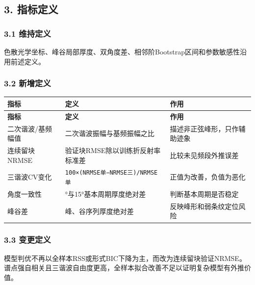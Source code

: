 \documentclass[11pt,a4paper]{ctexart}
\begin{document}
\subsection*{3. 指标定义}
\subsubsection*{3.1 维持定义}
色散光学坐标、峰谷局部厚度、双角度差、相邻阶Bootstrap区间和参数敏感性沿用前述定义。


\subsubsection*{3.2 新增定义}
\begin{center}
\scriptsize
\begin{longtable}{|>{\raggedright\arraybackslash}p{}|>{\raggedright\arraybackslash}p{}|>{\raggedright\arraybackslash}p{}|}
\hline
\textbf{指标} & \textbf{定义} & \textbf{作用} \\ \hline
\endfirsthead
\hline \textbf{指标} & \textbf{定义} & \textbf{作用} \\ \hline
\endhead
二次谐波/基频幅值 & 二次谐波振幅与基频振幅之比 & 描述非正弦峰形，只作辅助迹象 \\ \hline
连续留块NRMSE & 验证块RMSE除以训练折反射率标准差 & 比较未见频段外推误差 \\ \hline
三谐波CV变化 & \texttt{100×(NRMSE单−NRMSE三)/NRMSE单} & 正值为改善，负值为恶化 \\ \hline
角度一致性 & 10°与15°基本周期厚度绝对差 & 判断基本周期是否稳定 \\ \hline
峰谷差 & 峰、谷序列厚度绝对差 & 反映峰形和弱条纹定位风险 \\ \hline
\end{longtable}
\normalsize
\end{center}
\subsubsection*{3.3 变更定义}
模型判优不再以全样本RSS或形式BIC下降为主，而改为连续留块验证NRMSE。谱点强自相关且三谐波自由度更高，全样本拟合改善不足以证明复杂模型有外推价值。
\end{document}
